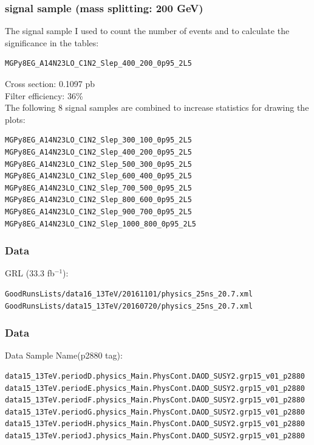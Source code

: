 \documentclass[mathserif,serif]{beamer}
\begin{document}
\begin{frame}[fragile]
\frametitle{signal sample (mass splitting: 200 GeV)}
\small
The signal sample I used to count the number of events and to calculate the significance in the tables:
\tiny
\begin{verbatim}
MGPy8EG_A14N23LO_C1N2_Slep_400_200_0p95_2L5
\end{verbatim}
\small
Cross section: 0.1097 pb \\
Filter efficiency: 36\% \\
\vspace{5mm}
The following 8 signal samples are combined to increase statistics for drawing the plots:
\tiny
\begin{verbatim}
MGPy8EG_A14N23LO_C1N2_Slep_300_100_0p95_2L5
MGPy8EG_A14N23LO_C1N2_Slep_400_200_0p95_2L5
MGPy8EG_A14N23LO_C1N2_Slep_500_300_0p95_2L5
MGPy8EG_A14N23LO_C1N2_Slep_600_400_0p95_2L5
MGPy8EG_A14N23LO_C1N2_Slep_700_500_0p95_2L5
MGPy8EG_A14N23LO_C1N2_Slep_800_600_0p95_2L5
MGPy8EG_A14N23LO_C1N2_Slep_900_700_0p95_2L5
MGPy8EG_A14N23LO_C1N2_Slep_1000_800_0p95_2L5
\end{verbatim}
\end{frame}

\begin{frame}[fragile]
\frametitle{Data}
\small
GRL (33.3 fb$^{-1}$):\\
\tiny
\begin{verbatim}
GoodRunsLists/data16_13TeV/20161101/physics_25ns_20.7.xml
GoodRunsLists/data15_13TeV/20160720/physics_25ns_20.7.xml
\end{verbatim}
\end{frame}

\begin{frame}[fragile]
\frametitle{Data}
\small
Data Sample Name(p2880 tag):
\tiny
\begin{verbatim}
data15_13TeV.periodD.physics_Main.PhysCont.DAOD_SUSY2.grp15_v01_p2880
data15_13TeV.periodE.physics_Main.PhysCont.DAOD_SUSY2.grp15_v01_p2880
data15_13TeV.periodF.physics_Main.PhysCont.DAOD_SUSY2.grp15_v01_p2880
data15_13TeV.periodG.physics_Main.PhysCont.DAOD_SUSY2.grp15_v01_p2880
data15_13TeV.periodH.physics_Main.PhysCont.DAOD_SUSY2.grp15_v01_p2880
data15_13TeV.periodJ.physics_Main.PhysCont.DAOD_SUSY2.grp15_v01_p2880
\end{verbatim}
\end{frame}
\end{document}
